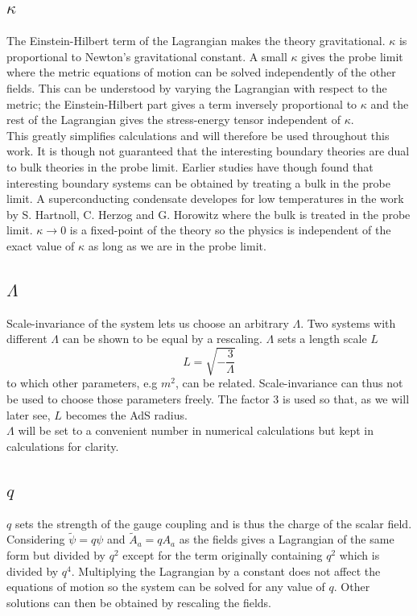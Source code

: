 \documentclass[12pt]{report}
\begin{document}
\subsection{$\kappa$\label{s:kappa}}
The Einstein-Hilbert term of the Lagrangian makes the theory gravitational. $\kappa$ is proportional to Newton's gravitational constant. A small $\kappa$ gives the probe limit where the metric equations of motion can be solved independently of the other fields. This can be understood by varying the Lagrangian with respect to the metric; the Einstein-Hilbert part gives a term inversely proportional to $\kappa$ and the rest of the Lagrangian gives the stress-energy tensor independent of $\kappa$.\\

This greatly simplifies calculations and will therefore be used throughout this work. It is though not guaranteed that the interesting boundary theories are dual to bulk theories in the probe limit. Earlier studies have though found that interesting boundary systems can be obtained by treating a bulk in the probe limit. A superconducting condensate developes for low temperatures in the work by S. Hartnoll, C. Herzog and G. Horowitz \cite{hartnoll9} where the bulk is treated in the probe limit. $\kappa\rightarrow0$ is a fixed-point of the theory so the physics is independent of the exact value of $\kappa$ as long as we are in the probe limit.
\subsection{$\Lambda$}
Scale-invariance of the system lets us choose an arbitrary $\Lambda$. Two systems with different $\Lambda$ can be shown to be equal by a rescaling. $\Lambda$ sets a length scale $L$
\begin{equation}
L=\sqrt{-\frac{3}{\Lambda}}
\end{equation}
to which other parameters, e.g $m^2$, can be related. Scale-invariance can thus not be used to choose those parameters freely. The factor 3 is used so that, as we will later see, $L$ becomes the AdS radius.\\

$\Lambda$ will be set to a convenient number in numerical calculations but kept in calculations for clarity.
\subsection{$q$}
$q$ sets the strength of the gauge coupling and is thus the charge of the scalar field. Considering $\tilde{\psi}=q\psi$ and $\tilde{A}_a=qA_a$ as the fields gives a Lagrangian of the same form but divided by $q^2$ except for the term originally containing $q^2$ which is divided by $q^4$. Multiplying the Lagrangian by a constant does not affect the equations of motion so the system can be solved for any value of $q$. Other solutions can then be obtained by rescaling the fields.\\
\end{document}

